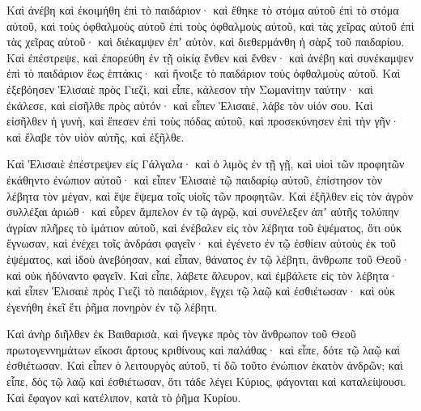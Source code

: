 {Καὶ ἀνέβη καὶ ἐκοιμήθη ἐπὶ τὸ παιδάριον· καὶ ἔθηκε τὸ στόμα αὐτοῦ ἐπὶ τὸ στόμα αὐτοῦ, καὶ τοὺς ὀφθαλμοὺς αὐτοῦ ἐπὶ τοὺς ὀφθαλμοὺς αὐτοῦ, καὶ τὰς χεῖρας αὐτοῦ ἐπὶ τὰς χεῖρας αὐτοῦ· καὶ διέκαμψεν ἐπʼ αὐτὸν, καὶ διεθερμάνθη ἡ σὰρξ τοῦ παιδαρίου.
Καὶ ἐπέστρεψε, καὶ ἐπορεύθη ἐν τῇ οἰκίᾳ ἔνθεν καὶ ἔνθεν· καὶ ἀνέβη καὶ συνέκαμψεν ἐπὶ τὸ παιδάριον ἕως ἑπτάκις· καὶ ἤνοιξε τὸ παιδάριον τοὺς ὀφθαλμοὺς αὐτοῦ.
Καὶ ἐξεβόησεν Ἑλισαιὲ πρὸς Γιεζὶ, καὶ εἶπε, κάλεσον τὴν Σωμανίτην ταύτην· καὶ ἐκάλεσε, καὶ εἰσῆλθε πρὸς αὐτόν· καὶ εἶπεν Ἑλισαιὲ, λάβε τὸν υἱόν σου.
Καὶ εἰσῆλθεν ἡ γυνὴ, καὶ ἔπεσεν ἐπὶ τοὺς πόδας αὐτοῦ, καὶ προσεκύνησεν ἐπὶ τὴν γῆν· καὶ ἔλαβε τὸν υἱὸν αὐτῆς, καὶ ἐξῆλθε.
\par }{\PP {}Καὶ Ἑλισαιὲ ἐπέστρεψεν εἰς Γάλγαλα· καὶ ὁ λιμὸς ἐν τῇ γῇ, καὶ υἱοὶ τῶν προφητῶν ἐκάθηντο ἐνώπιον αὐτοῦ· καὶ εἶπεν Ἑλισαιὲ τῷ παιδαρίῳ αὐτοῦ, ἐπίστησον τὸν λέβητα τὸν μέγαν, καὶ ἕψε ἕψεμα τοῖς υἱοῖς τῶν προφητῶν.
Καὶ ἐξῆλθεν εἰς τὸν ἀγρὸν συλλέξαι ἀριώθ· καὶ εὗρεν ἄμπελον ἐν τῷ ἀγρῷ, καὶ συνέλεξεν ἀπʼ αὐτῆς τολύπην ἀγρίαν πλῆρες τὸ ἱμάτιον αὐτοῦ, καὶ ἐνέβαλεν εἰς τὸν λέβητα τοῦ ἑψέματος, ὅτι οὐκ ἔγνωσαν, καὶ ἐνέχει τοῖς ἀνδράσι φαγεῖν·
καὶ ἐγένετο ἐν τῷ ἐσθίειν αὐτοὺς ἐκ τοῦ ἑψέματος, καὶ ἰδοὺ ἀνεβόησαν, καὶ εἶπαν, θάνατος ἐν τῷ λέβητι, ἄνθρωπε τοῦ Θεοῦ· καὶ οὐκ ἠδύναντο φαγεῖν.
Καὶ εἶπε, λάβετε ἅλευρον, καὶ ἐμβάλετε εἰς τὸν λέβητα· καὶ εἶπεν Ἑλισαιὲ πρὸς Γιεζὶ τὸ παιδάριον, ἔγχει τῷ λαῷ καὶ ἐσθιέτωσαν· καὶ οὐκ ἐγενήθη ἐκεῖ ἔτι ῥῆμα πονηρὸν ἐν τῷ λέβητι.
\par }{\PP {}Καὶ ἀνὴρ διῆλθεν ἐκ Βαιθαρισὰ, καὶ ἤνεγκε πρὸς τὸν ἄνθρωπον τοῦ Θεοῦ πρωτογεννημάτων εἴκοσι ἄρτους κριθίνους καὶ παλάθας· καὶ εἶπε, δότε τῷ λαῷ καὶ ἐσθιέτωσαν.
Καὶ εἶπεν ὁ λειτουργὸς αὐτοῦ, τί δῶ τοῦτο ἐνώπιον ἑκατὸν ἀνδρῶν; καὶ εἶπε, δὸς τῷ λαῷ καὶ ἐσθιέτωσαν, ὅτι τάδε λέγει Κύριος, φάγονται καὶ καταλείψουσι.
Καὶ ἔφαγον καὶ κατέλιπον, κατὰ τὸ ῥῆμα Κυρίου.

}
